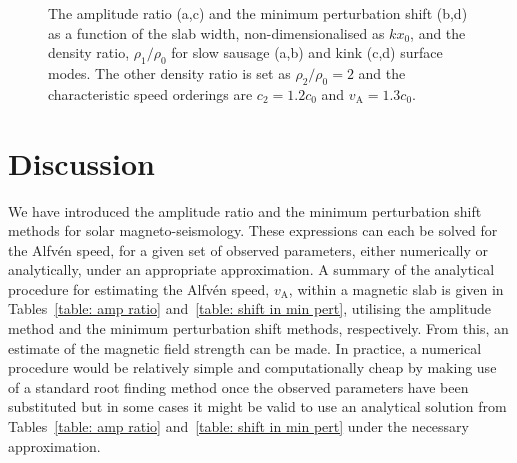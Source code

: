 \documentclass[namedreferences]{solarphysics}
\numberwithin{equation}{section}
\begin{document}
\begin{article}
\begin{figure}
{\label{fig: AR slow saus surf}}
\caption{The amplitude ratio (a,c) and the minimum perturbation shift (b,d)  as a function of the slab width, non-dimensionalised as $ kx_0 $, and the density ratio, $ \rho_1/\rho_0 $ for slow sausage (a,b) and kink (c,d) surface modes. The other density ratio is set as $\rho_2/\rho_0 = 2$ and the characteristic speed orderings are $c_2=1.2c_0$ and $v_\textrm{A}=1.3c_0$.}
\label{fig: AR MPS}
\end{figure}

\section{Discussion}

We have introduced the amplitude ratio and the minimum perturbation shift methods for solar magneto-seismology. These expressions can each be solved for the Alfv\'{e}n speed, for a given set of observed parameters, either numerically or analytically, under an appropriate approximation. A summary of the analytical procedure for estimating the Alfv\'{e}n speed, $v_\textrm{A}$, within a magnetic slab is given in Tables~\ref{table: amp ratio} and~\ref{table: shift in min pert}, utilising the amplitude method and the minimum perturbation shift methods, respectively. From this, an estimate of the magnetic field strength can be made. In practice, a numerical procedure would be relatively simple and computationally cheap by making use of a standard root finding method once the observed parameters have been substituted but in some cases it might be valid to use an analytical solution from Tables~\ref{table: amp ratio} and~\ref{table: shift in min pert} under the necessary approximation.


\end{article}
\end{document}
